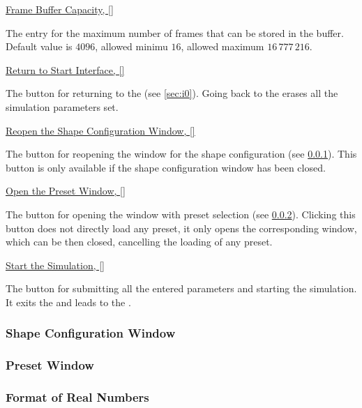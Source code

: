 \documentclass{article}
\newcommand{\vxlisp}{\vspace*{12pt}}
\begin{document}
\underline{Frame Buffer Capacity, [\numcap]}
\undrsep

The entry for the maximum number of frames that can be stored in the buffer. Default value is $4096$, allowed minimu $16$, allowed maximum $16\,777\,216$.
\vxlisp

\underline{Return to Start Interface, [\numbackhome]}
\undrsep

The button for returning to the \inull{} (see \ref{sec:i0}). Going back to the \inull{} erases all the simulation parameters set.
\vxlisp

\underline{Reopen the Shape Configuration Window, [\numeditor]}
\undrsep

The button for reopening the window for the shape configuration (see \ref{sec:shapeconfig}). This button is only available if the shape configuration window has been closed.
\vxlisp

\underline{Open the Preset Window, [\numpreset]}
\undrsep

The button for opening the window with preset selection (see \ref{sec:presets}). Clicking this button does not directly load any preset, it only opens the corresponding window, which can be then closed, cancelling the loading of any preset.
\vxlisp

\underline{Start the Simulation, [\numstart]}
\undrsep

The button for submitting all the entered parameters and starting the simulation. It exits the \ione{} and leads to the \itwo{}.

\subsubsection{Shape Configuration Window}\label{sec:shapeconfig}

\subsubsection{Preset Window}\label{sec:presets}

\subsubsection{Format of Real Numbers}

\end{document}
